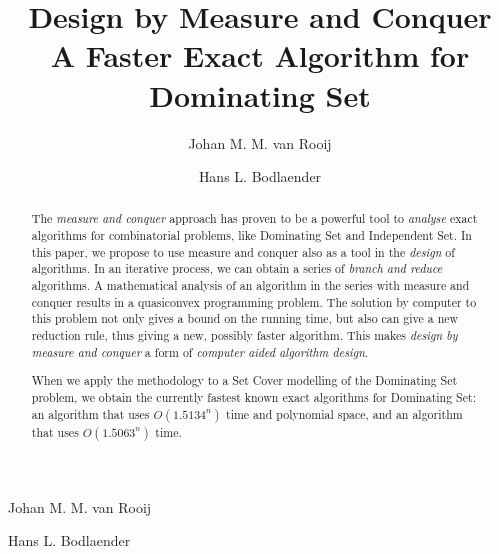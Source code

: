 \documentclass[fleqn]{stacs_proc}
\begin{document}
\title[Design by Measure and Conquer: A Faster Algorithm for Dominating Set]{Design by Measure and Conquer \\ A Faster Exact Algorithm for Dominating Set}
\author{Johan M. M. van Rooij}{Johan M. M. van Rooij}
\author{Hans L. Bodlaender}{Hans L. Bodlaender}
\address{
Institute of Information and Computing Sciences, Utrecht University, \newline
P.O.Box 80.089, 3508 TB Utrecht, The Netherlands
}







\begin{abstract}
The {\em measure and conquer} approach has proven to be a powerful tool to
{\em analyse} exact algorithms for combinatorial problems, like {\sc Dominating Set} and
{\sc Independent Set}. In this paper, we propose to use measure and conquer
also as a tool in the {\em design} of algorithms. 
In an iterative process, we can obtain a series of {\em branch and reduce} algorithms.
A mathematical analysis of an algorithm in the series with measure and conquer
results in a quasiconvex programming problem.
The solution by computer
to this problem not only gives a bound on the running time,
but also can give a new reduction rule, thus giving a new,
possibly faster algorithm.
This makes {\em design by measure and conquer} a form of {\em computer aided algorithm design}.

When we apply the methodology to a {\sc Set Cover} modelling of
the {\sc Dominating Set} problem, we obtain the
currently fastest known exact algorithms for {\sc Dominating Set}: an algorithm
that uses $O(1.5134^n)$ time and polynomial space, and an algorithm
that uses $O(1.5063^n)$ time.
\end{abstract} 

\maketitle
\end{document}
